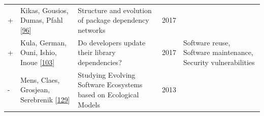 \documentclass[]{book}
\begin{document}
\begin{longtable}[]{@{}lllll@{}}
\begin{minipage}[t]{0.01\columnwidth}
+\strut
\end{minipage} & \begin{minipage}[t]{0.09\columnwidth}\raggedright\strut
Kikas, Gousios, Dumas, Pfahl
{[}\protect\hyperlink{ref-Kikas2017}{96}{]}\strut
\end{minipage} & \begin{minipage}[t]{0.34\columnwidth}\raggedright\strut
Structure and evolution of package dependency networks\strut
\end{minipage} & \begin{minipage}[t]{0.02\columnwidth}\raggedright\strut
2017\strut
\end{minipage} & \begin{minipage}[t]{0.39\columnwidth}\raggedright\strut
\strut
\end{minipage}\tabularnewline
\begin{minipage}[t]{0.01\columnwidth}\raggedright\strut
+\strut
\end{minipage} & \begin{minipage}[t]{0.09\columnwidth}\raggedright\strut
Kula, German, Ouni, Ishio, Inoue
{[}\protect\hyperlink{ref-Kula2017}{103}{]}\strut
\end{minipage} & \begin{minipage}[t]{0.34\columnwidth}\raggedright\strut
Do developers update their library dependencies?\strut
\end{minipage} & \begin{minipage}[t]{0.02\columnwidth}\raggedright\strut
2017\strut
\end{minipage} & \begin{minipage}[t]{0.39\columnwidth}\raggedright\strut
Software reuse, Software maintenance, Security vulnerabilities\strut
\end{minipage}\tabularnewline
\begin{minipage}[t]{0.01\columnwidth}\raggedright\strut
-\strut
\end{minipage} & \begin{minipage}[t]{0.09\columnwidth}\raggedright\strut
Mens, Claes, Grosjean, Serebrenik
{[}\protect\hyperlink{ref-Mens2013}{129}{]}\strut
\end{minipage} & \begin{minipage}[t]{0.34\columnwidth}\raggedright\strut
Studying Evolving Software Ecosystems based on Ecological Models\strut
\end{minipage} & \begin{minipage}[t]{0.02\columnwidth}\raggedright\strut
2013\strut
\end{minipage} & \begin{minipage}[t]{0.39\columnwidth}\raggedright\strut

\end{minipage}
\end{longtable}
\end{document}
